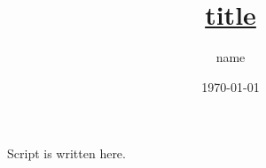 \documentclass[12pt,dvipdfmx,svgnames,a4paper,uplatex]{ujreport}
\title{\underline{title}}
\author{name}
\date{\today}
\begin{document}
\maketitle
\tableofcontents
\clearpage

Script is written here.

% 

\end{document}
